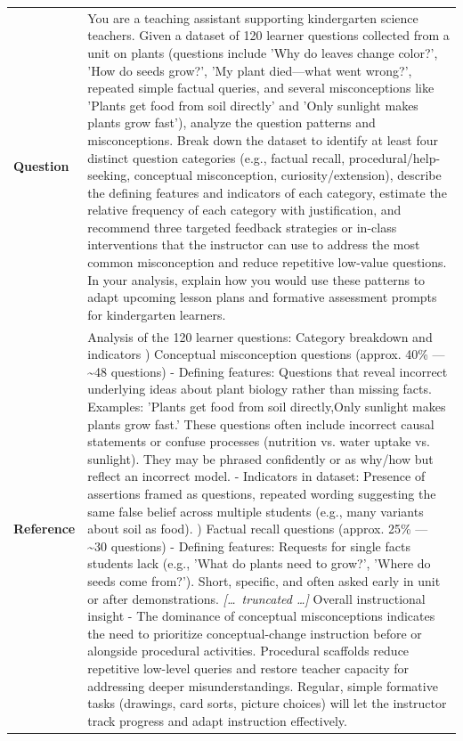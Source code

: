 \begin{longtable}{@{}l p{12.5cm}@{}}
  \textbf{Question} & You are a teaching assistant supporting kindergarten science teachers. Given a dataset of 120 learner questions collected from a unit on plants (questions include 'Why do leaves change color?', 'How do seeds grow?', 'My plant died---what went wrong?', repeated simple factual queries, and several misconceptions like 'Plants get food from soil directly' and 'Only sunlight makes plants grow fast'), analyze the question patterns and misconceptions. Break down the dataset to identify at least four distinct question categories (e.g., factual recall, procedural/help-seeking, conceptual misconception, curiosity/extension), describe the defining features and indicators of each category, estimate the relative frequency of each category with justification, and recommend three targeted feedback strategies or in-class interventions that the instructor can use to address the most common misconception and reduce repetitive low-value questions. In your analysis, explain how you would use these patterns to adapt upcoming lesson plans and formative assessment prompts for kindergarten learners. \\
  \textbf{Reference} & Analysis of the 120 learner questions: Category breakdown and indicators \newline 1) Conceptual misconception questions (approx. 40\% --- \textasciitilde{}48 questions) \newline - Defining features: Questions that reveal incorrect underlying ideas about plant biology rather than missing facts. Examples: 'Plants get food from soil directly,Only sunlight makes plants grow fast.' These questions often include incorrect causal statements or confuse processes (nutrition vs. water uptake vs. sunlight). They may be phrased confidently or as why/how but reflect an incorrect model. \newline - Indicators in dataset: Presence of assertions framed as questions, repeated wording suggesting the same false belief across multiple students (e.g., many variants about soil as food). \newline 2) Factual recall questions (approx. 25\% --- \textasciitilde{}30 questions) \newline - Defining features: Requests for single facts students lack (e.g., 'What do plants need to grow?', 'Where do seeds come from?'). Short, specific, and often asked early in unit or after demonstrations. \newline \textit{[\ldots\ truncated \ldots]} \newline Overall instructional insight \newline - The dominance of conceptual misconceptions indicates the need to prioritize conceptual-change instruction before or alongside procedural activities. Procedural scaffolds reduce repetitive low-level queries and restore teacher capacity for addressing deeper misunderstandings. Regular, simple formative tasks (drawings, card sorts, picture choices) will let the instructor track progress and adapt instruction effectively. \\

\end{longtable}
